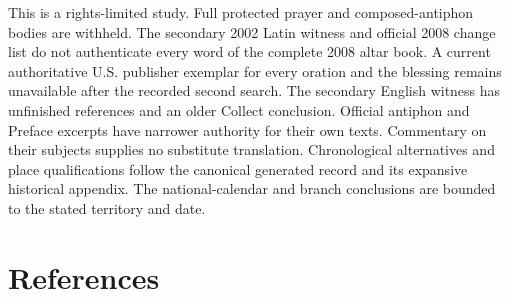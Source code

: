 This is a rights-limited study. Full protected prayer and composed-antiphon bodies are withheld. The secondary 2002 Latin witness and official 2008 change list do not authenticate every word of the complete 2008 altar book. A current authoritative U.S. publisher exemplar for every oration and the blessing remains unavailable after the recorded second search. The secondary English witness has unfinished references and an older Collect conclusion. Official antiphon and Preface excerpts have narrower authority for their own texts. Commentary on their subjects supplies no substitute translation. Chronological alternatives and place qualifications follow the canonical generated record and its expansive historical appendix. The national-calendar and branch conclusions are bounded to the stated territory and date.

\section{References}

